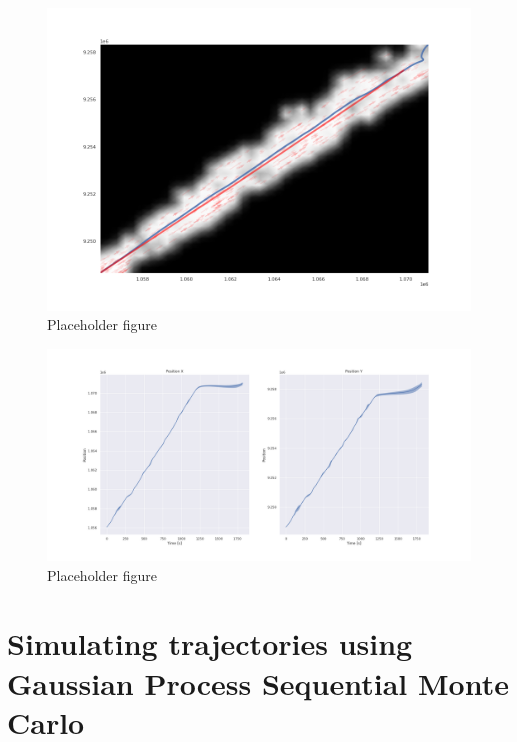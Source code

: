 \begin{figure}
    \centering
    \includegraphics[width=\textwidth]{master-thesis/figures/gp_ekf.png}
    \caption{Placeholder figure}
    \label{fig:my_label}
\end{figure}

\begin{figure}
    \centering
    \includegraphics[width=\textwidth]{master-thesis/figures/gp_ekf_unc.png}
    \caption{Placeholder figure}
    \label{fig:my_label}
\end{figure}


\section{Simulating trajectories using Gaussian Process Sequential Monte Carlo}